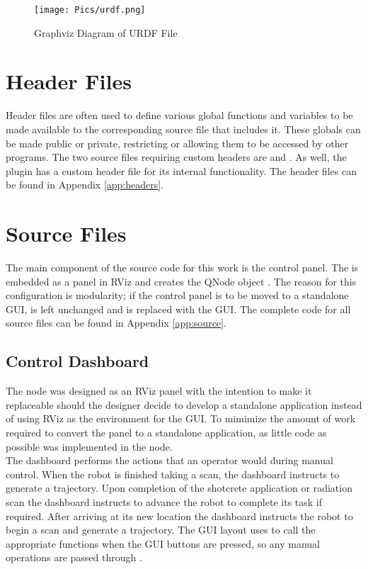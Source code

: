 \begin{figure}[h]
    \centering
    \texttt{[image: Pics/urdf.png]}
    \caption{Graphviz Diagram of URDF File}
    \label{fig:urdf}
\end{figure}

\section{Header Files}
Header files are often used to define various global functions and variables to be made available to the corresponding source file that includes it. These globals can be made public or private, restricting or allowing them to be accessed by other programs. The two source files requiring custom headers are  and . As well, the  plugin has a custom header file for its internal functionality. The header files can be found in Appendix \ref{app:headers}.\\

\section{Source Files}
The main component of the source code for this work is the control panel. The  is embedded as a panel in RViz and creates the QNode object . The reason for this configuration is modularity; if the control panel is to be moved to a standalone GUI,  is left unchanged and  is replaced with the GUI. The complete code for all source files can be found in Appendix \ref{app:source}.
\subsection{Control Dashboard}
The  node was designed as an RViz panel with the intention to make it replaceable should the designer decide to develop a standalone application instead of using RViz as the environment for the GUI. To mimimize the amount of work required to convert the panel to a standalone application, as little code as possible was implemented in the node.\\
The dashboard performs the actions that an operator would during manual control. When the robot is finished taking a scan, the dashboard instructs  to generate a trajectory. Upon completion of the shotcrete application or radiation scan the dashboard instructs  to advance the robot to complete its task if required. After arriving at its new location the dashboard instructs the robot to begin a scan and generate a trajectory. The GUI layout uses  to call the appropriate  functions when the GUI buttons are pressed, so any manual operations are passed through .\\
